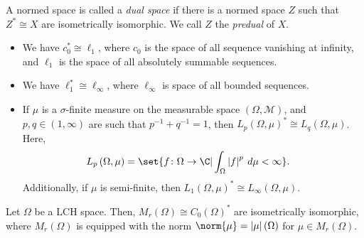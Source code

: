\begin{definition}
  A normed space is called a \textit{dual space} if there is a normed space $Z$ such that $Z^{\ast} \cong X$ are isometrically isomorphic. We call $Z$ the \textit{predual} of $X$.
\end{definition}
\begin{example}\hfill
  \begin{itemize}
    \item We have $c_0^{\ast}\cong \ell_1$, where $c_0$ is the space of all sequence vanishing at infinity, and $\ell_1$ is the space of all absolutely summable sequences.
    \item We have $\ell_1^{\ast}\cong \ell_{\infty}$, where $\ell_{\infty}$ is space of all bounded sequences.
    \item If $\mu$ is a $\sigma$-finite measure on the measurable space $\left(\Omega,\mathcal{M}\right)$, and $p,q\in (1,\infty)$ are such that $p^{-1} + q^{-1} = 1$, then $L_{p}\left(\Omega,\mu\right)^{\ast} \cong L_q\left(\Omega,\mu\right)$. Here,
      \begin{align*}
        L_p\left(\Omega,\mu\right) &= \set{f\colon \Omega\rightarrow \C | \int_{\Omega}^{} \left\vert f \right\vert^p\:d\mu < \infty}.
      \end{align*}
      Additionally, if $\mu$ is semi-finite, then $L_1\left(\Omega,\mu\right)^{\ast}\cong L_{\infty}\left(\Omega,\mu\right)$.
  \end{itemize}
\end{example}
\begin{theorem}
  Let $\Omega$ be a LCH space. Then, $M_r\left(\Omega\right) \cong C_0\left(\Omega\right)^{\ast}$ are isometrically isomorphic, where $M_r\left(\Omega\right)$ is equipped with the norm $\norm{\mu} = \left\vert \mu \right\vert\left(\Omega\right)$ for $\mu\in M_r\left(\Omega\right)$.
\end{theorem}
